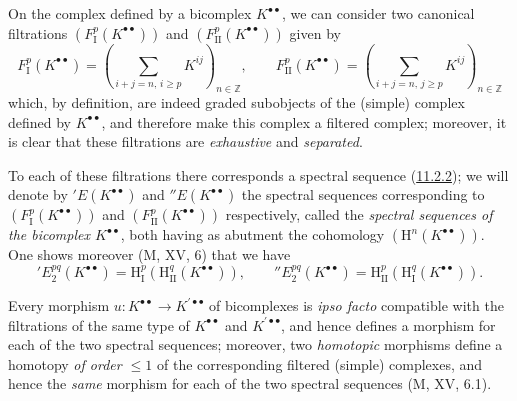 \begin{env}[11.3.2]
\label{0.11.3.2}
On the complex defined by a bicomplex $K^{\bullet\bullet}$, we can
consider two canonical filtrations
$(F_{\mathrm I}^p(K^{\bullet\bullet}))$ and
$(F_{\mathrm{II}}^p(K^{\bullet\bullet}))$ given by
\[
\label{0.11.3.2.1}
  F_{\mathrm I}^p(K^{\bullet\bullet})
  =\left(\sum_{i+j=n,\,i\geq p}K^{ij}\right)_{n\in\mathbb Z},
  \qquad
  F_{\mathrm{II}}^p(K^{\bullet\bullet})
  =\left(\sum_{i+j=n,\,j\geq p}K^{ij}\right)_{n\in\mathbb Z}
  \tag{11.3.2.1}
\]
which, by definition, are indeed graded subobjects of the (simple) complex
defined by $K^{\bullet\bullet}$, and therefore make this complex a filtered
complex; moreover, it is clear that these filtrations are \emph{exhaustive} and
\emph{separated}.

To each of these filtrations there corresponds a spectral sequence
(\hyperref[0.11.2.2]{11.2.2}); we will denote by
$'E(K^{\bullet\bullet})$ and $''E(K^{\bullet\bullet})$ the spectral sequences
corresponding to $(F_{\mathrm I}^p(K^{\bullet\bullet}))$ and
$(F_{\mathrm{II}}^p(K^{\bullet\bullet}))$ respectively, called the
\emph{spectral sequences of the bicomplex $K^{\bullet\bullet}$}, both
having as abutment the cohomology
$(\mathrm H^n(K^{\bullet\bullet}))$. One shows moreover (M, XV, 6) that we have
\[
\label{0.11.3.2.2}
  'E_2^{pq}(K^{\bullet\bullet})
  =\mathrm H_{\mathrm I}^p(\mathrm H_{\mathrm{II}}^q(K^{\bullet\bullet})),
  \qquad
  ''E_2^{pq}(K^{\bullet\bullet})
  =\mathrm H_{\mathrm{II}}^p(\mathrm H_{\mathrm I}^q(K^{\bullet\bullet})).
  \tag{11.3.2.2}
\]

Every morphism $u:K^{\bullet\bullet}\to K^{\prime\bullet\bullet}$ of
bicomplexes is \emph{ipso facto} compatible with the filtrations of the same
type of $K^{\bullet\bullet}$ and $K^{\prime\bullet\bullet}$, and hence defines a
morphism for each of the two spectral sequences; moreover, two
\emph{homotopic} morphisms define a homotopy \emph{of order $\leq1$} of the
corresponding filtered (simple) complexes, and hence the \emph{same} morphism for
each of the two spectral sequences (M, XV, 6.1).
\end{env}

